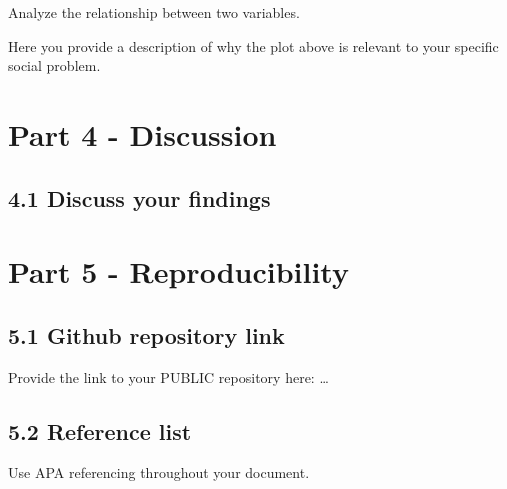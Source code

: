 \documentclass[
]{article}
\begin{document}
Analyze the relationship between two variables.

Here you provide a description of why the plot above is relevant to your
specific social problem.

\section{Part 4 - Discussion}\label{part-4---discussion}

\subsection{4.1 Discuss your findings}\label{discuss-your-findings}

\section{Part 5 - Reproducibility}\label{part-5---reproducibility}

\subsection{5.1 Github repository link}\label{github-repository-link}

Provide the link to your PUBLIC repository here: \ldots{}

\subsection{5.2 Reference list}\label{reference-list}

Use APA referencing throughout your document.
\end{document}
